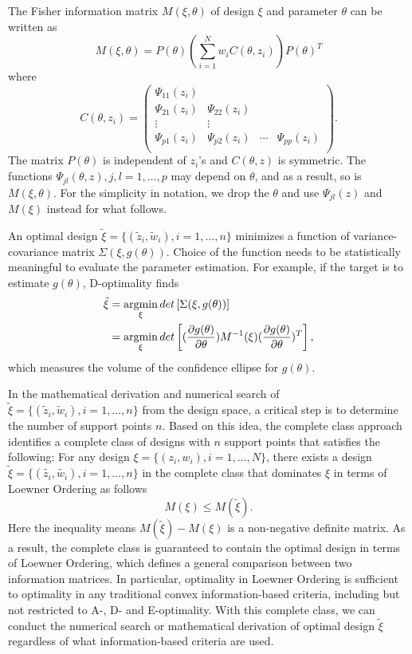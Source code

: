 \documentclass[12pt]{amsart}
\theoremstyle{definition}
\theoremstyle{remark}
\newcommand{\argmin}{\operatornamewithlimits{argmin}}
\numberwithin{equation}{section}
\begin{document}
The Fisher information matrix $M(\xi,\theta)$ of design $\xi$ and parameter $\theta$ can be written as  \begin{equation}\label{eq:1}
M(\xi,\theta)  = P(\theta)(\sum_{i=1}^Nw_iC(\theta,z_i))P(\theta)^T
\end{equation}where \begin{equation}\label{eq:2}
C(\theta,z_i) = \left ( \begin{array}{cccc}
\Psi_{11}(z_i) &&&\\
\Psi_{21}(z_i) &\Psi_{22}(z_i)&&\\
\vdots & \vdots &&\\
\Psi_{p1}(z_i) &\Psi_{p2}(z_i)&\cdots&\Psi_{pp}(z_i)\\
\end{array} \right).\end{equation}
The matrix $P(\theta)$ is independent of $z_i$'s and $C(\theta,z)$ is symmetric. The functions $\Psi_{jl}(\theta,z), j,l=1,\ldots,p$ may depend on $\theta$, and as a result, so is $M(\xi,\theta)$. For the simplicity in notation, we drop the $\theta$ and use $\Psi_{jl}(z)$ and $M(\xi)$ instead for what follows. 

An optimal design $\tilde{\xi} = \{(\tilde{z}_i,\tilde{w}_i), i=1,\ldots,n\}$ minimizes a function of variance-covariance matrix $\Sigma(\xi, g(\theta))$. Choice of the function needs to be statistically meaningful to evaluate the parameter estimation. For example, if the target is to estimate $g(\theta)$, D-optimality finds \begin{align*}
    \tilde{\xi}&=\argmin_\xi det\left[\Sigma(\xi, g(\theta))\right]\\
     & =\argmin_\xi det\left[(\frac{\partial g(\theta)}{\partial \theta})M^{-1}(\xi)(\frac{\partial g(\theta)}{\partial \theta})^T\right],
\end{align*}
 which measures the volume of the confidence ellipse for $g(\theta)$.

In the mathematical derivation and numerical search of $\tilde{\xi} = \{(\tilde{z}_i,\tilde{w}_i), i=1,\ldots,n\}$ from the design space, a critical step is to determine the number of support points $n$. Based on this idea, the complete class approach identifies a complete class of designs with $n$ support points that satisfies the following: For any design $\xi=\{(z_i,w_i), i=1,\ldots,N\}$, there exists a design $\tilde{\xi} = \{(\tilde{z_i},\tilde{w_i}), i=1,\ldots,n\}$ in the complete class that dominates $\xi$ in terms of Loewner Ordering as follows
\begin{equation}\label{l-ordering}
    M(\xi)\le M(\tilde{\xi}).
\end{equation} Here the inequality means $M(\tilde{\xi})-M(\xi)$ is a non-negative definite matrix. As a result, the complete class is guaranteed to contain the optimal design in terms of Loewner Ordering, which defines a general comparison between two information matrices. In particular, optimality in Loewner Ordering is sufficient to optimality in any traditional convex information-based criteria, including but not restricted to A-, D- and E-optimality. With this complete class, we can conduct the numerical search or mathematical derivation of optimal design $\tilde{\xi}$ regardless of what information-based criteria are used. 
\end{document}
